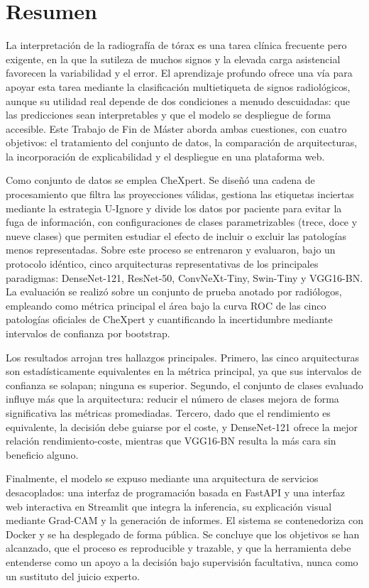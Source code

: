 \newpage
\section*{Resumen}
\label{sec::resumen}


La interpretación de la radiografía de tórax es una tarea clínica frecuente pero
exigente, en la que la sutileza de muchos signos y la elevada carga asistencial
favorecen la variabilidad y el error. El aprendizaje profundo ofrece una vía para
apoyar esta tarea mediante la clasificación multietiqueta de signos radiológicos, aunque
su utilidad real depende de dos condiciones a menudo descuidadas: que las predicciones
sean interpretables y que el modelo se despliegue de forma accesible. Este Trabajo de
Fin de Máster aborda ambas cuestiones, con cuatro objetivos: el tratamiento del conjunto
de datos, la comparación de arquitecturas, la incorporación de explicabilidad y el
despliegue en una plataforma web.

Como conjunto de datos se emplea CheXpert. Se diseñó una cadena de procesamiento que
filtra las proyecciones válidas, gestiona las etiquetas inciertas mediante la estrategia
U-Ignore y divide los datos por paciente para evitar la fuga de información, con
configuraciones de clases parametrizables (trece, doce y nueve clases) que permiten
estudiar el efecto de incluir o excluir las patologías menos representadas. Sobre este
proceso se entrenaron y evaluaron, bajo un protocolo idéntico, cinco arquitecturas
representativas de los principales paradigmas: DenseNet-121, ResNet-50, ConvNeXt-Tiny,
Swin-Tiny y VGG16-BN. La evaluación se realizó sobre un conjunto de prueba anotado por
radiólogos, empleando como métrica principal el área bajo la curva ROC de las cinco
patologías oficiales de CheXpert y cuantificando la incertidumbre mediante intervalos de
confianza por bootstrap.

Los resultados arrojan tres hallazgos principales. Primero, las cinco arquitecturas son
estadísticamente equivalentes en la métrica principal, ya que sus intervalos de
confianza se solapan; ninguna es superior. Segundo, el conjunto de clases evaluado
influye más que la arquitectura: reducir el número de clases mejora de forma
significativa las métricas promediadas. Tercero, dado que el rendimiento es equivalente,
la decisión debe guiarse por el coste, y DenseNet-121 ofrece la mejor relación
rendimiento-coste, mientras que VGG16-BN resulta la más cara sin beneficio alguno.

Finalmente, el modelo se expuso mediante una arquitectura de servicios desacoplados: una
interfaz de programación basada en FastAPI y una interfaz web interactiva en Streamlit
que integra la inferencia, su explicación visual mediante Grad-CAM y la generación de
informes. El sistema se contenedoriza con Docker y se ha desplegado de forma pública. Se
concluye que los objetivos se han alcanzado, que el proceso es reproducible y trazable, y
que la herramienta debe entenderse como un apoyo a la decisión bajo supervisión
facultativa, nunca como un sustituto del juicio experto.

